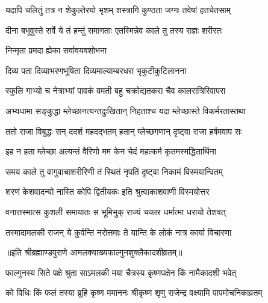 \twolineshloka
{यदापि चलितुं तत्र न शेकुल्तेरयो भृशम्}
{शस्त्रागि कुण्ठता जग्गः तवेषां हतचेतसाम्} %

\twolineshloka
{दीना बभूवुस्ते सर्वे ये तं हन्तुं समागताः}
{एतस्मिन्नेव काले तु तस्य राज्ञः शरीरतः} %

\onelineshloka
{निन्मृता प्रमदा ह्येका सर्वावयवशोभना} %

\twolineshloka
{दिव्य पता दिव्याभरणभूषिता}
{दिव्यमाल्याम्बरधरा भृकुटीकुटिलानना} %

\twolineshloka
{स्फुलि गाभ्यो च नेत्राभ्यां पावकं वमती बहु}
{चक्रोद्यतकरा चैव कालरात्रिरिवापरा} %

\twolineshloka
{अभ्यधामा सङ्कुद्धा म्लेच्छानत्यन्तदुःखितान्}
{निहताश्च यदा म्लेच्छास्ते विकर्मरतास्तथा} %

\twolineshloka
{ततो राजा विबुद्धः सन् ददर्श महदद्भतम्}
{हतान् म्लेच्छगणान् दृष्ट्वा राजा हर्षमवाप सः} %

\twolineshloka
{इह न हता म्लेच्छा अत्यन्तं वैरिणो मम}
{केन चेदं महत्कर्म कृतमस्मद्धितार्थिना} %

\twolineshloka
{समय काले तु वागुवाचाशरीरिणी}
{तं स्थितं नृपतिं दृष्ट्वा निकामं विस्मयान्वितम्} %

\twolineshloka
{शरणं केशवादन्यो नास्ति कोपि द्वितीयकः}
{इति श्रुत्वाकाशवाणी विस्मयोत्तर} %

\twolineshloka
{वनात्तस्मात्स कुशली समायातः स भूमिभुक्}
{राज्यं चकार धर्मात्मा धरायो तेशवत्} %


\twolineshloka
{तस्मादामलकी राजन् ये कुर्वन्ति नरोत्तमाः}
{ते यान्ति के लोकं नात्र कार्या विचारणा} %

॥इति श्रीब्रह्माण्डपुराणे आमलक्याख्यफाल्गुनशुक्लैकादशीव्रतम्॥


\hyperref[sec:ekadashi_mahatmyam_vrata_raja]{\closesub}
\clearpage

\label{sec:vrata-raja-chaitra-krishna-papamochani}


\twolineshloka
{फाल्गुनस्य सिते पक्षे श्रुता साऽमलकी मया}
{चैत्रस्य कृष्णपक्षेन किं नामैकादशी भवेत्} %

\twolineshloka
{को विधिः किं फलं तस्या ब्रूहि कृष्ण ममाननः}
{श्रीकृष्ण शृणु राजेन्द्र वक्ष्यामि पापमोचनिकाव्रतम्} %




